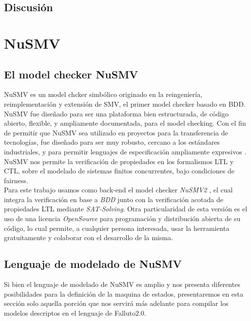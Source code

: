 \documentclass[titlepage, 12pt]{book}
\begin{document}
\section{Discusi\'on}





\chapter{NuSMV}
\section{El model checker NuSMV}

NuSMV es un model chcker simb\'olico originado en la reingenier\'ia, reimplementaci\'on y extensi\'on de SMV, el primer model checker basado en BDD. NuSMV fue dise\~nado para ser una plataforma bien estructurada, de c\'odigo abierto, flexible, y ampliamente documentada, para el model checking. Con el fin de permitir que NuSMV sea utilizado en proyectos para la transferencia de tecnolog\'ias, fue dise\~nado para ser muy robusto, cercano a los est\'andares industriales, y para permitir lenguajes de especificaci\'on ampliamente expresivos \cite{Cimatti}.\\

NuSMV nos permite la verificaci\'on de propiedades en los formalismos LTL y CTL, sobre el modelado de sistemas finitos concurrentes, bajo condiciones de fairness.\\

Para este trabajo usamos como back-end el model checker \textit{NuSMV2} \cite{NuSMV2}, el cual integra la verificaci\'on en base a \textit{BDD} junto con la verificaci\'on acotada de propiedades LTL mediante \textit{SAT-Solving}. Otra particularidad de esta versi\'on es el uso de una licencia \textit{OpenSource} para programaci\'on y distribuci\'on abierta de su c\'odigo, lo cual permite, a cualquier persona interesada, usar la herramienta gratuitamente y colaborar con el desarrollo de la misma.


\section{Lenguaje de modelado de NuSMV}
Si bien el lenguaje de modelado de NuSMV es amplio y nos presenta diferentes posibilidades para la definici\'on de la maquina de estados, presentaremos en esta secci\'on solo aquella porci\'on que nos servir\'a m\'as adelante para compilar los modelos descriptos en el lenguaje de Falluto2.0.\\
\end{document}
